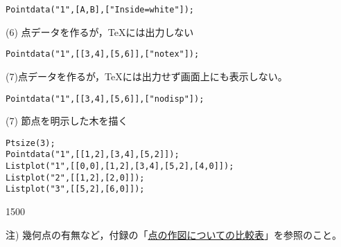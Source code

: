 \documentclass[papersize,a4paper,10pt,uplatex]{jsarticle}
\begin{document}
\begin{description}
\hspace{10mm}\verb|Pointdata("1",[A,B],["Inside=white"]);|

(6) 点データを作るが，TeXには出力しない

\hspace{10mm}\verb|Pointdata("1",[[3,4],[5,6]],["notex"]);|

(7)点データを作るが，TeXには出力せず画面上にも表示しない。

\hspace{10mm} \verb|Pointdata("1",[[3,4],[5,6]],["nodisp"]);|



(7) 節点を明示した木を描く
\begin{verbatim}
Ptsize(3); 
Pointdata("1",[[1,2],[3,4],[5,2]]); 
Listplot("1",[[0,0],[1,2],[3,4],[5,2],[4,0]]); 
Listplot("2",[[1,2],[2,0]]); 
Listplot("3",[[5,2],[6,0]]);
\end{verbatim}

\begin{layer}{150}{0}
\end{layer}


注) 幾何点の有無など，付録の「\hyperlink{mkpttable}{点の作図についての比較表}」を参照のこと。









\end{description}
\end{document}

